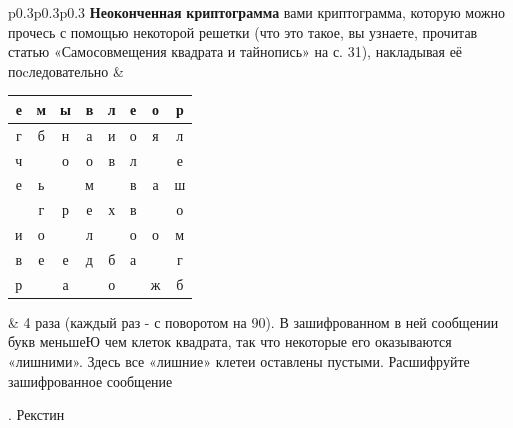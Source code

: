 \documentclass{article}
\begin{document}
\sloppy
\vspace{10}
\begin{tabular}{p{}p{}p{}}
\huge\textbf{Неоконченная} \vspace{20} \textbf{криптограмма}\newline
{} вами криптограмма, которую можно прочесь с помощью некоторой решетки (что это такое, вы узнаете, прочитав статью «Самосовмещения квадрата и тайнопись» на с. 31), накладывая её поcледовательно
&
\vspace{1}
\begin{tabular}{|c|c|c|c|c|c|c|c|}%
\hline
е & м & ы & в & л & е & о & р \\
\hline
г & б & н & а & и & о & я & л \\
\hline
ч &  & о & о & в & л &  & е \\
\hline
е & ь &  & м &  & в & а & ш \\
\hline
 & г & р & е & х & в &  & о \\
\hline
и & о &  & л &  & о & о & м \\
\hline
в & е & е & д & б & а &  & г \\
\hline
р &  & а &  & о &  & ж & б \\
\hline
\end{tabular}
&
4 раза (каждый раз - с поворотом на 90\degree). В зашифрованном в ней сообщении букв меньшеЮ чем клеток квадрата, так что некоторые его оказываются «лишними». Здесь все «лишние» клетеи оставлены пустыми.\newline
\quad Расшифруйте зашифрованное сообщение
\begin{flushright}
    . Рекстин
\end{flushright}
\\
\end{tabular}

\hspace{0pt} 
\end{document}
